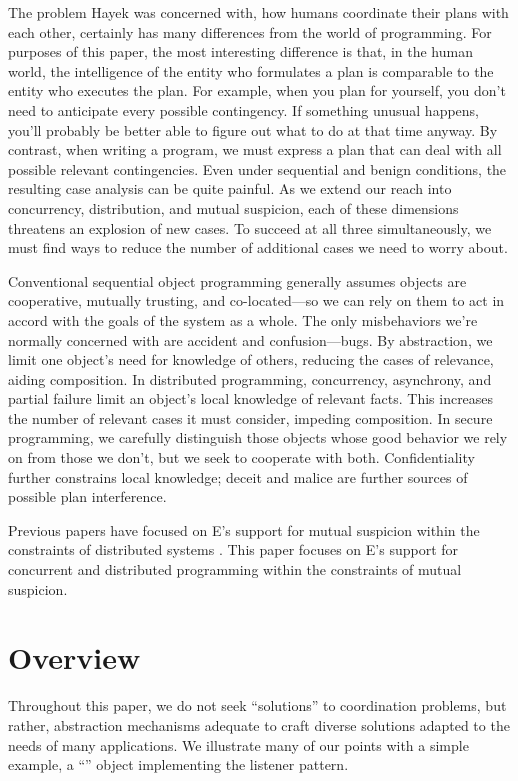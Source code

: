 \documentclass{llncs}
\begin{document}
The problem Hayek was concerned with, how humans coordinate their
plans with each other, certainly has many differences from the world
of programming. For purposes of this paper, the most interesting
difference is that, in the human world, the intelligence of the entity
who formulates a plan is comparable to the entity who executes the
plan. For example, when you plan for yourself, you don't need to
anticipate every possible contingency. If something unusual happens,
you'll probably be better able to figure out what to do at that time
anyway. By contrast, when writing a program, we must express a plan
that can deal with all possible relevant contingencies. Even under
sequential and benign conditions, the resulting case analysis can be
quite painful. As we extend our reach into concurrency, distribution,
and mutual suspicion, each of these dimensions threatens an explosion
of new cases. To succeed at all three simultaneously, we must find
ways to reduce the number of additional cases we need to worry about.

Conventional sequential object programming generally assumes objects
are cooperative, mutually trusting, and co-located---so we can rely
on them to act in accord with the goals of the system as a whole. The
only misbehaviors we're normally concerned with are accident and
confusion---bugs. By abstraction, we limit one object's need for
knowledge of others, reducing the cases of relevance, aiding
composition. In distributed programming, concurrency, asynchrony, and
partial failure limit an object's local knowledge of relevant
facts. This increases the number of relevant cases it must consider,
impeding composition. In secure programming, we carefully distinguish
those objects whose good behavior we rely on from those we don't, but
we seek to cooperate with both. Confidentiality further constrains
local knowledge; deceit and malice are further sources of possible
plan interference.

Previous papers have focused on E's support for mutual suspicion
within the constraints of distributed systems
\cite{miller:ode,miller:myths,miller:paradigm,miller:struct-auth}. This
paper focuses on E's support for concurrent and distributed
programming within the constraints of mutual suspicion.

\section{Overview}

Throughout this paper, we do not seek ``solutions'' to coordination
problems, but rather, abstraction mechanisms adequate to craft diverse
solutions adapted to the needs of many applications. We illustrate
many of our points with a simple example, a ``'' object
implementing the listener pattern.
\end{document}
